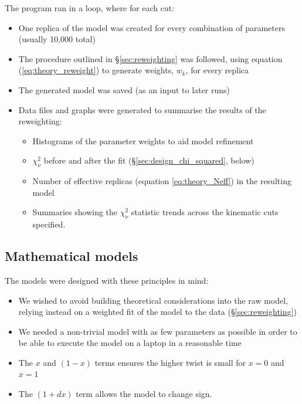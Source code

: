 \documentclass[12pt,a4paper]{report}
\newcommand*{\lr}[1]{\left( {#1} \right)}
\begin{document}
The program ran in a loop, where for each cut:
\begin{itemize}
\item One replica of the model was created for every combination of parameters (usually 10,000 total)
\item The procedure outlined in \S \ref{sec:reweighting} was followed, using equation (\ref{eq:theory_reweight}) to generate weights, $w_k$, for every replica
\item The generated model was saved (as an input to later runs)
\item Data files and graphs were generated to summarise the results of the reweighting:
    \begin{itemize}
    \item Histograms of the parameter weights to aid model refinement
    \item $\chi_\nu^2$ before and after the fit (\S \ref{sec:design_chi_squared}, below)
    \item Number of effective replicas (equation \ref{eq:theory_Neff}) in the resulting model
    \item Summaries showing the $\chi_\nu^2$ statistic trends across the kinematic cuts specified.
    \end{itemize}
\end{itemize}

\subsection{Mathematical models}

The models were designed with these principles in mind:
\begin{itemize}
\item We wished to avoid building theoretical considerations into the raw model, relying instead on a weighted fit of the model to the data (\S \ref{sec:reweighting})
\item We needed a non-trivial model with as few parameters as possible in order to be able to execute the model on a laptop in a reasonable time
\item The $x$ and $\lr{1 - x}$ terms ensures the higher twist is small for $x=0$ and $x=1$
\item The $\lr{1 + d x}$ term allows the model to change sign.
\end{itemize}
\end{document}
